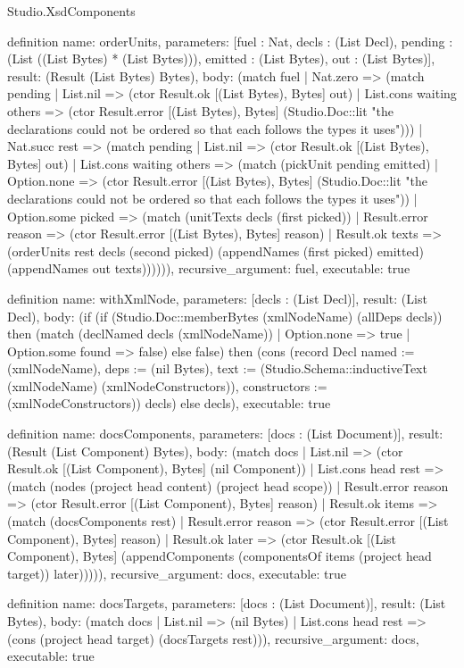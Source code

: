 \begin{lexlean}{Studio.XsdComponents}
\begin{semanticmodule}
definition{
  name: orderUnits,
  parameters: [fuel : Nat, decls : (List Decl), pending : (List ((List Bytes) * (List Bytes))), emitted : (List Bytes), out : (List Bytes)],
  result: (Result (List Bytes) Bytes),
  body: (match fuel
    | Nat.zero => (match pending
      | List.nil => (ctor Result.ok [(List Bytes), Bytes] out)
      | List.cons waiting others => (ctor Result.error [(List Bytes), Bytes] (Studio.Doc::lit "the declarations could not be ordered so that each follows the types it uses")))
    | Nat.succ rest => (match pending
      | List.nil => (ctor Result.ok [(List Bytes), Bytes] out)
      | List.cons waiting others => (match (pickUnit pending emitted)
        | Option.none => (ctor Result.error [(List Bytes), Bytes] (Studio.Doc::lit "the declarations could not be ordered so that each follows the types it uses"))
        | Option.some picked => (match (unitTexts decls (first picked))
          | Result.error reason => (ctor Result.error [(List Bytes), Bytes] reason)
          | Result.ok texts => (orderUnits rest decls (second picked) (appendNames (first picked) emitted) (appendNames out texts)))))),
  recursive_argument: fuel,
  executable: true
}

definition{
  name: withXmlNode,
  parameters: [decls : (List Decl)],
  result: (List Decl),
  body: (if (if (Studio.Doc::memberBytes (xmlNodeName) (allDeps decls)) then (match (declNamed decls (xmlNodeName))
    | Option.none => true
    | Option.some found => false) else false) then (cons (record Decl {named := (xmlNodeName), deps := (nil Bytes), text := (Studio.Schema::inductiveText (xmlNodeName) (xmlNodeConstructors)), constructors := (xmlNodeConstructors)}) decls) else decls),
  executable: true
}

definition{
  name: docsComponents,
  parameters: [docs : (List Document)],
  result: (Result (List Component) Bytes),
  body: (match docs
    | List.nil => (ctor Result.ok [(List Component), Bytes] (nil Component))
    | List.cons head rest => (match (nodes (project head content) (project head scope))
      | Result.error reason => (ctor Result.error [(List Component), Bytes] reason)
      | Result.ok items => (match (docsComponents rest)
        | Result.error reason => (ctor Result.error [(List Component), Bytes] reason)
        | Result.ok later => (ctor Result.ok [(List Component), Bytes] (appendComponents (componentsOf items (project head target)) later))))),
  recursive_argument: docs,
  executable: true
}

definition{
  name: docsTargets,
  parameters: [docs : (List Document)],
  result: (List Bytes),
  body: (match docs
    | List.nil => (nil Bytes)
    | List.cons head rest => (cons (project head target) (docsTargets rest))),
  recursive_argument: docs,
  executable: true
}


\end{semanticmodule}
\end{lexlean}
